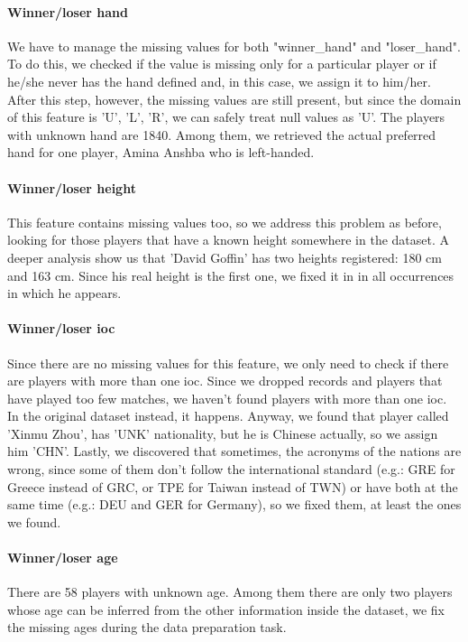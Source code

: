 \paragraph{Winner/loser hand}
We have to manage the missing values for both "winner\_hand" and "loser\_hand". To do this, we checked if the value is missing only for a particular player or if he/she never has the hand defined and, in this case, we assign it to him/her. After this step, however, the missing values are still present, but since the domain of this feature is {'U', 'L', 'R'}, we can safely treat null values as 'U'. The players with unknown hand are 1840. Among them, we retrieved the actual preferred hand for one player, Amina Anshba who is left-handed.

\paragraph{Winner/loser height}
This feature contains missing values too, so we address this problem as before, looking for those players that have a known height somewhere in the dataset. A deeper analysis show us that 'David Goffin' has two heights registered: 180 cm and 163 cm. Since his real height is the first one, we fixed it in in all occurrences in which he appears.

\paragraph{Winner/loser ioc}
Since there are no missing values for this feature, we only need to check if there are players with more than one ioc. Since we dropped records and players that have played too few matches, we haven't found players with more than one ioc. In the original dataset instead, it happens. Anyway, we found that player called 'Xinmu Zhou', has 'UNK' nationality, but he is Chinese actually, so we assign him 'CHN'. Lastly, we discovered that sometimes, the acronyms of the nations are wrong, since some of them don't follow the international standard (e.g.: GRE for Greece instead of GRC, or TPE for Taiwan instead of TWN) or have both at the same time (e.g.: DEU and GER for Germany), so we fixed them, at least the ones we found.

\paragraph{Winner/loser age}
There are 58 players with unknown age. Among them there are only two players whose age can be inferred from the other information inside the dataset, we fix the missing ages during the data preparation task. 

